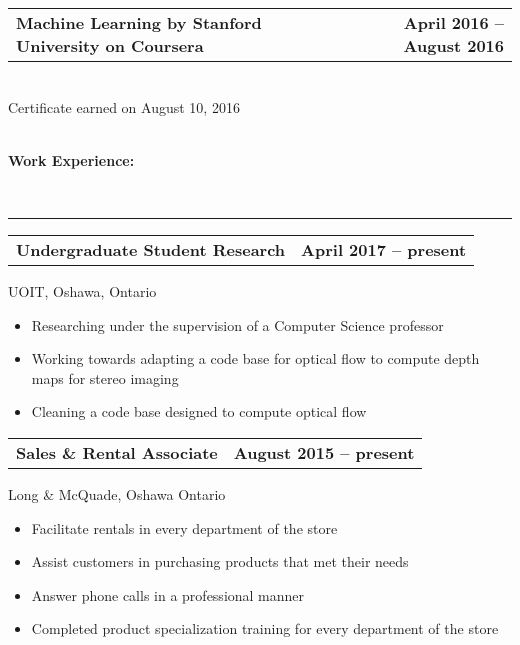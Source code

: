 \documentclass[]{article}
\begin{document}
\begin{tabu} to 
  \textbf{Machine Learning by Stanford University on Coursera} &
  \textbf{April 2016 -- August 2016}
\end{tabu} \\
%
Certificate earned on August 10, 2016
\\
\\
\begin{large} \textbf{Work Experience:} \end{large}\\
\rule[1.2ex]{\linewidth}{0.4pt}
\begin{tabu} to 
\textbf{Undergraduate Student Research}& 
\textbf {April 2017 -- present}
\end{tabu}
%
UOIT, Oshawa, Ontario
%
\begin{itemize}
\item
  Researching under the supervision of a Computer Science professor
\item
  Working towards adapting a code base for optical flow to compute
  depth maps for stereo imaging
\item
  Cleaning a code base designed to compute optical flow
\end{itemize}
%
\begin{tabu} to 
  \textbf{Sales \& Rental Associate} &
  \textbf{August 2015 -- present}
\end{tabu}
%
Long \& McQuade, Oshawa Ontario
%
\begin{itemize}
\item
  Facilitate rentals in every department of the store
\item
  Assist customers in purchasing products that met their needs
\item
  Answer phone calls in a professional manner
\item
  Completed product specialization training for every department of
  the store
\end{itemize}
\end{document}
